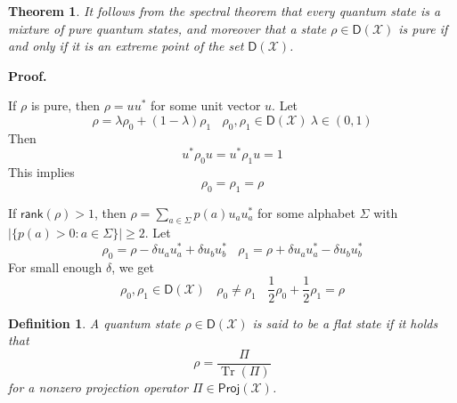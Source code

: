 \documentclass[aps,pra,onecolumn,notitlepage,superscriptaddress]{revtex4-1}
\newcommand{\spc}[1]{\mathcal{#1}}
\newcommand{\D}{\mathsf{D}}
\newcommand{\Proj}{\mathsf{Proj}}
\newcommand{\rank}{\mathsf{rank}}
\newcommand{\Tr}{\operatorname{Tr}}
\newtheorem{theo}{Theorem}
\newtheorem{defi}{Definition}
\def\Proof{{\bf Proof.~}}
\begin{document}
    \begin{theo}
        It follows from the spectral theorem that every quantum state is a mixture of pure quantum states, and moreover that a state $\rho \in \D(\spc X)$ is pure if and only if it is an extreme point of the set $\D(\spc X)$.
    \end{theo}
    \Proof {
        If $\rho$ is pure, then $\rho = uu^*$ for some unit vector $u$. Let 
        \begin{equation}
            \rho = \lambda \rho_0 + (1-\lambda) \rho_1 \ \ \ \ \rho_0, \rho_1 \in \D(\spc X) \ \lambda \in (0,1)
        \end{equation}
        Then
        \begin{equation}
            u^* \rho_0 u = u^* \rho_1 u = 1
        \end{equation}
        This implies
        \begin{equation}
            \rho_0 = \rho_1 = \rho
        \end{equation}

        If $\rank(\rho) > 1$, then $\rho = \sum_{a \in \Sigma} p(a)u_au_a^*$ for some alphabet $\Sigma$ with $|\{ p(a) > 0 : a \in \Sigma \}| \geq 2$. Let
        \begin{equation}
            \rho_0 = \rho - \delta u_au_a^* + \delta u_bu_b^* \ \ \ \ 
            \rho_1 = \rho + \delta u_au_a^* - \delta u_bu_b^*
        \end{equation}
        For small enough $\delta$, we get
        \begin{equation}
            \rho_0,\rho_1 \in \D(\spc X) \ \ \ \ \rho_0 \neq \rho_1 \ \ \ \ \frac{1}{2} \rho_0 + \frac{1}{2} \rho_1 = \rho
        \end{equation}
    }

    \begin{defi}
        A quantum state $\rho \in \D(\spc X)$ is said to be a flat state if it holds that
        \begin{equation}
            \rho = \frac{\Pi}{\Tr(\Pi)}
        \end{equation}
        for a nonzero projection operator $\Pi \in \Proj(\spc X)$. 
    \end{defi}
\end{document}
